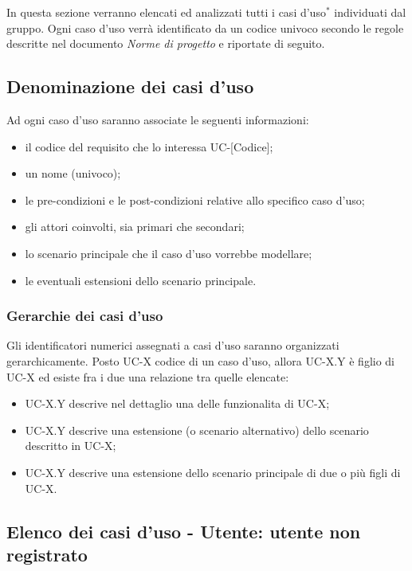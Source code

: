 In questa sezione verranno elencati ed analizzati tutti i casi d'uso$^*$ individuati dal gruppo. Ogni caso d'uso verrà identificato da un codice univoco secondo le regole descritte nel documento \textit{Norme di progetto} e riportate di seguito. 
\subsection{Denominazione dei casi d'uso}
Ad ogni caso d'uso saranno associate le seguenti informazioni:
\begin{itemize}
\item il codice del requisito che lo interessa UC-[Codice];
\item un nome (univoco);
\item le pre-condizioni e le post-condizioni relative allo specifico caso d'uso;
\item gli attori coinvolti, sia primari che secondari;
\item lo scenario principale che il caso d'uso vorrebbe modellare;
\item le eventuali estensioni dello scenario principale.
\end{itemize}

\subsubsection{Gerarchie dei casi d'uso} 

Gli identificatori numerici assegnati a casi d'uso saranno organizzati gerarchicamente. Posto UC-X codice di un caso d'uso, allora UC-X.Y è figlio di UC-X ed esiste fra i due una relazione tra quelle elencate:
\begin{itemize}
\item UC-X.Y descrive nel dettaglio una delle funzionalita di UC-X;
\item UC-X.Y descrive una estensione (o scenario alternativo) dello scenario descritto in UC-X; 
\item UC-X.Y descrive una estensione dello scenario principale di due o più figli di UC-X.
\end{itemize}

\subsection{Elenco dei casi d'uso - Utente: utente non registrato}

